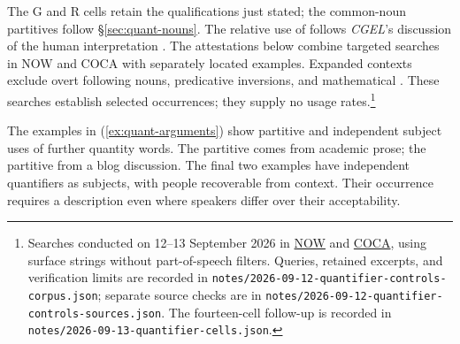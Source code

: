 \documentclass[12pt]{article}
\begin{document}
The G and R cells retain the qualifications just stated; the common-noun partitives follow §\ref{sec:quant-nouns}. The relative use of  follows \textit{CGEL}'s discussion of the human interpretation \citep[414]{huddleston2002}. The attestations below combine targeted searches in NOW and COCA with separately located examples. Expanded contexts exclude overt following nouns, predicative inversions, and mathematical . These searches establish selected occurrences; they supply no usage rates.\footnote{Searches conducted on 12--13 September 2026 in \href{https://www.english-corpora.org/now/}{NOW} and \href{https://www.english-corpora.org/coca/}{COCA}, using surface strings without part-of-speech filters. Queries, retained excerpts, and verification limits are recorded in \nolinkurl{notes/2026-09-12-quantifier-controls-corpus.json}; separate source checks are in \nolinkurl{notes/2026-09-12-quantifier-controls-sources.json}. The fourteen-cell follow-up is recorded in \nolinkurl{notes/2026-09-13-quantifier-cells.json}.}

The examples in (\ref{ex:quant-arguments}) show partitive and independent subject uses of further quantity words. The  partitive comes from academic prose; the  partitive from a blog discussion. The final two examples have independent quantifiers as subjects, with people recoverable from context. Their occurrence requires a description even where speakers differ over their acceptability.
\end{document}
